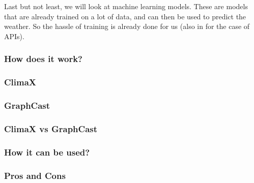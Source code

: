 \documentclass[../paper.tex]{subfiles}
\begin{document}
    Last but not least, we will look at machine learning models.
    These are models that are already trained on a lot of data, and can then be used to predict the weather.
    So the hassle of training is already done for us (also in for the case of APIs).

    \subsubsection{How does it work?}

    \subsubsection{ClimaX}

    \subsubsection{GraphCast}

    \subsubsection{ClimaX vs GraphCast}

    \subsubsection{How it can be used?}

    \subsubsection{Pros and Cons}
\end{document}
